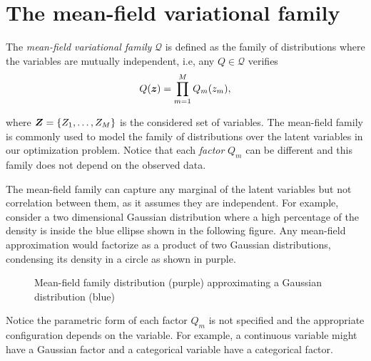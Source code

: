 \section{The mean-field variational family}

The \emph{mean-field variational family} \(\mathcal{Q}\) is defined as the family of distributions where the variables are mutually independent, i.e, any \(Q \in \mathcal{Q}\) verifies
\[
  Q(\bm{z}) = \prod_{m=1}^{M}Q_{m}(z_{m}),
\]

where \(\bm{Z} = \{Z_{1},\dots,Z_{M}\}\) is the considered set of variables. The mean-field family is commonly used to model the family of distributions over the latent variables in our optimization problem. Notice that each \emph{factor} \(Q_{m}\) can be different and this family does not depend on the observed data.

The mean-field family can capture any marginal of the latent variables but not correlation between them, as it assumes they are independent. For example, consider a two dimensional Gaussian distribution where a high percentage of the density is inside the blue ellipse shown in the following figure. Any mean-field approximation would factorize as a product of two Gaussian distributions, condensing its density in a circle as shown in purple.

\begin{figure}[h!]
\centering
{}
  \caption{Mean-field family distribution (purple) approximating a Gaussian distribution (blue)}
\end{figure}

Notice the parametric form of each factor \(Q_{m}\) is not specified and the appropriate configuration depends on the variable. For example, a continuous variable might have a Gaussian factor and a categorical variable have a categorical factor.

